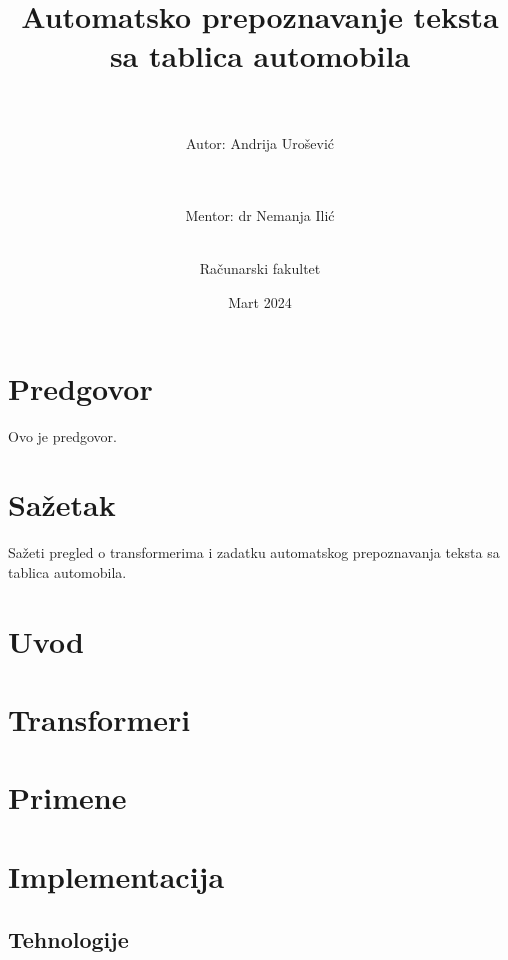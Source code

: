 \documentclass[a4paper,12pt,titlepage]{article}
\begin{document}
	\begin{titlepage}
		\title{Automatsko prepoznavanje teksta sa tablica automobila}
		\author{\\\\Autor: Andrija Urošević\and \\\\Mentor: dr Nemanja Ilić\\\\ \and Računarski fakultet}
		\date{Mart 2024}
		\maketitle
	\end{titlepage}
	
	
	\section*{Predgovor}
	Ovo je predgovor. 
	\newpage
	
	\tableofcontents
	\newpage
	
	
	\section*{Sažetak}
	Sažeti pregled o transformerima i zadatku automatskog prepoznavanja teksta sa tablica automobila.
	\newpage
	
	\section{Uvod}
	\newpage
	
	\section{Transformeri}
	\newpage
	
	\section{Primene}
	\newpage
	
	\section{Implementacija}
	\subsection{Tehnologije}
\end{document}
